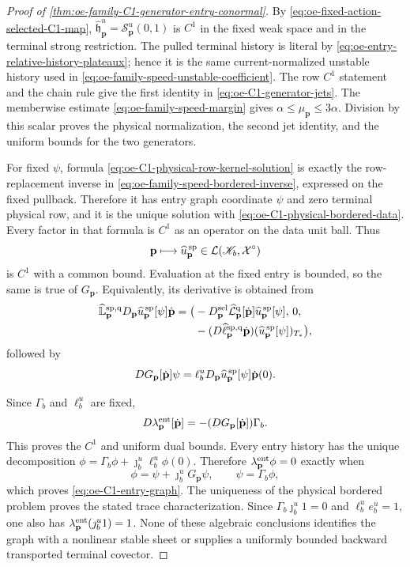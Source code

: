 \begin{proof}[Proof of
\cref{thm:oe-family-C1-generator-entry-conormal}]
By
\cref{eq:oe-fixed-action-selected-C1-map},
\(\widehat{\mathfrak h}_{\mathbf p}^{u}
=\mathscr S_{\mathbf p}^{u}(0,1)\) is \(C^1\) in the fixed weak space
and in the terminal strong restriction.  The pulled terminal history is
literal by
\cref{eq:oe-entry-relative-history-plateaux}; hence it is the same
current-normalized unstable history used in
\cref{eq:oe-family-speed-unstable-coefficient}.  The row \(C^1\)
statement and the chain rule give the first identity in
\cref{eq:oe-C1-generator-jets}.  The memberwise estimate
\cref{eq:oe-family-speed-margin} gives
\(\alpha\le\mu_{\mathbf p}\le3\alpha\).  Division by this scalar proves
the physical normalization, the second jet identity, and the uniform
bounds for the two generators.

For fixed \(\psi\), formula
\cref{eq:oe-C1-physical-row-kernel-solution} is exactly the row-replacement
inverse in
\cref{eq:oe-family-speed-bordered-inverse}, expressed on the fixed
pullback.  Therefore it has entry graph coordinate \(\psi\) and zero
terminal physical row, and it is the unique solution with
\cref{eq:oe-C1-physical-bordered-data}.  Every factor in that formula
is \(C^1\) as an operator on the data unit ball.  Thus
\[
 \mathbf p\longmapsto
 \widehat u_{\mathbf p}^{\,\rm sp}
 \in\mathcal L(\mathscr K_b,\mathcal X^\circ)
\]
is \(C^1\) with a common bound.  Evaluation at the fixed entry is
bounded, so the same is true of \(G_{\mathbf p}\).  Equivalently, its
derivative is obtained from
\begin{align*}
 \widehat{\mathbb L}_{\mathbf p}^{\rm sp,q}
 D_{\mathbf p}\widehat u_{\mathbf p}^{\,\rm sp}[\psi]
       \dot{\mathbf p}
 =\bigl(&-D_{\mathbf p}^{\rm sel}
       \widehat{\mathcal L}_{\mathbf p}^{\rm q}
         [\dot{\mathbf p}]
       \widehat u_{\mathbf p}^{\,\rm sp}[\psi],\,0,\\
 &-(D\widehat\ell_{\mathbf p}^{\rm sp,q}
       \dot{\mathbf p})
       (\widehat u_{\mathbf p}^{\,\rm sp}[\psi])_{T_*}\bigr),
\end{align*}
followed by
\[
 DG_{\mathbf p}[\dot{\mathbf p}]\psi
 =\ell_b^u
   D_{\mathbf p}\widehat u_{\mathbf p}^{\,\rm sp}[\psi]
       \dot{\mathbf p}(0).
\]

Since \(\Gamma_b\) and \(\ell_b^u\) are fixed,
\[
 D\lambda_{\mathbf p}^{\rm ent}
       [\dot{\mathbf p}]
 =-(DG_{\mathbf p}[\dot{\mathbf p}])\Gamma_b.
\]
This proves the \(C^1\) and uniform dual bounds.  Every entry history has
the unique decomposition
\(\phi=\Gamma_b\phi+\jmath_b^u\ell_b^u\phi(0)\).  Therefore
\(\lambda_{\mathbf p}^{\rm ent}\phi=0\) exactly when
\[
 \phi=\psi+\jmath_b^uG_{\mathbf p}\psi,\qquad
 \psi=\Gamma_b\phi,
\]
which proves \cref{eq:oe-C1-entry-graph}.  The uniqueness of the
physical bordered problem proves the stated trace characterization.
Since \(\Gamma_b\jmath_b^u1=0\) and
\(\ell_b^ue_b^u=1\), one also has
\(\lambda_{\mathbf p}^{\rm ent}(\jmath_b^u1)=1\).
None of these algebraic conclusions identifies the graph with a
nonlinear stable sheet or supplies a uniformly bounded backward
transported terminal covector.
\end{proof}

